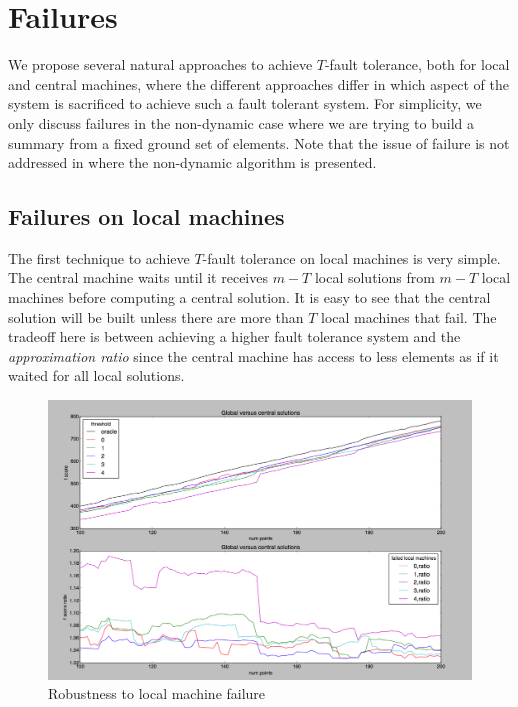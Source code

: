 \section{Failures}
\label{s:failures}
We propose several natural approaches to achieve $T$-fault tolerance, both for local and central machines, where the different approaches differ in which aspect of the system is sacrificed to achieve such a fault tolerant system. For simplicity, we only discuss failures in the non-dynamic case where we are trying to build a summary from a fixed ground set of elements. Note that the issue of failure is not addressed in \cite{mirzasoleiman2013distributed} where the non-dynamic algorithm is presented.

\subsection{Failures on local machines}

The first technique to achieve $T$-fault tolerance on local machines is very simple. The central machine waits until it receives $m -T$ local solutions from $m-T$ local machines before computing a central solution. It is easy to see that the central solution will be built unless there are more than $T$ local machines that fail. The tradeoff here is between achieving a higher fault tolerance system and the \textit{approximation ratio} since the central machine has access to less elements as if it waited for all local solutions.

\begin{figure}
    \centering
    \includegraphics[width=\linewidth]{failplot}
    \caption{Robustness to local machine failure}
     \label{fig:fail}
\end{figure}

